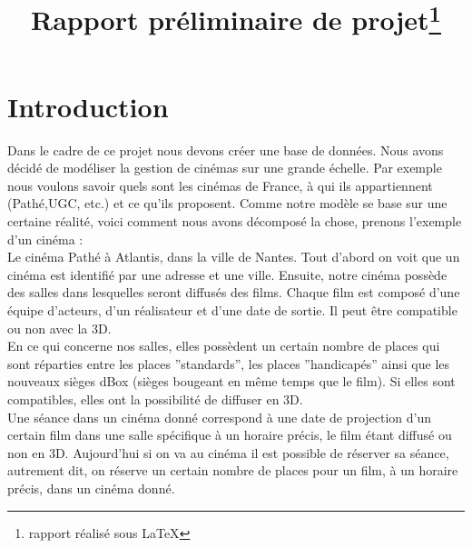 \documentclass[a4paper,sffamily,12pt]{article}
\title{\vspace{\fill}\LARGE\bfseries\sffamily Rapport préliminaire de projet\protect\footnote{rapport réalisé sous \LaTeX} \vspace{\fill}}
\begin{document}
	\date{} %
	\maketitle %

	\thispagestyle{fancy} %
	
	\newpage
			
	\renewcommand{\contentsname}{Sommaire}
	\tableofcontents
	
	\newpage
	
	\section{Introduction}
		
		\vspace{0.5cm}
		
		Dans le cadre de ce projet nous devons créer une base de données. Nous avons décidé de modéliser la gestion de cinémas sur une grande échelle. Par exemple nous voulons savoir quels sont les cinémas de France, à qui ils appartiennent (Pathé,UGC, etc.) et ce qu'ils proposent. Comme notre modèle se base sur une certaine réalité, voici comment nous avons décomposé la chose, prenons  l'exemple d'un cinéma : \\
		\indent Le cinéma Pathé à Atlantis, dans la ville de Nantes. Tout d'abord on voit que un cinéma est identifié par une adresse et une ville. Ensuite, notre cinéma possède des salles dans lesquelles seront diffusés des films. Chaque film est composé d'une équipe d'acteurs, d'un réalisateur et d'une date de sortie. Il peut être compatible ou non avec la 3D. \\ 				
		\indent En ce qui concerne nos salles, elles possèdent un certain nombre de places qui sont réparties entre les places ''standards'', les places ''handicapés'' ainsi que les nouveaux sièges dBox (sièges bougeant en même temps que le film). Si elles sont compatibles, elles ont la possibilité de diffuser en 3D. \\
		\indent Une séance dans un cinéma donné correspond à une date de projection d'un certain film dans une salle spécifique à un horaire précis, le film étant diffusé ou non en 3D. Aujourd'hui si on va au cinéma il est possible de réserver sa séance, autrement dit, on réserve un certain nombre de places pour un film, à un horaire précis, dans un cinéma donné. 

		\vspace{0.5cm}
								
\end{document}
